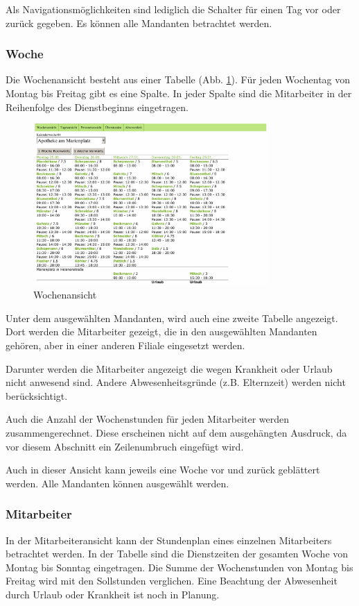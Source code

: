 \documentclass[10pt,a4paper,titlepage,oneside]{article}
\begin{document}
Als Navigationsmöglichkeiten sind lediglich die Schalter für einen Tag vor oder zurück gegeben. Es können alle Mandanten betrachtet werden.





\subsubsection{Woche}
Die Wochenansicht besteht aus einer Tabelle (Abb. \ref{fig:Wochenansicht}).
Für jeden Wochentag von Montag bis Freitag gibt es eine Spalte. In jeder Spalte sind die Mitarbeiter in der Reihenfolge des Dienstbeginns eingetragen.
\begin{figure}[h]
\centering
\includegraphics[width=0.8\textwidth]{woche-out}
\caption{Wochenansicht}
\label{fig:Wochenansicht}
\end{figure}

Unter dem ausgewählten Mandanten, wird auch eine zweite Tabelle angezeigt. Dort werden die Mitarbeiter gezeigt, die in den ausgewählten Mandanten gehören, aber in einer anderen Filiale eingesetzt werden.

Darunter werden die Mitarbeiter angezeigt die wegen Krankheit oder Urlaub nicht anwesend sind. Andere Abwesenheitsgründe (z.B. Elternzeit) werden nicht berücksichtigt.

Auch die Anzahl der Wochenstunden für jeden Mitarbeiter werden zusammengerechnet. Diese erscheinen nicht auf dem ausgehängten Ausdruck, da vor diesem Abschnitt ein Zeilenumbruch eingefügt wird. 

Auch in dieser Ansicht kann jeweils eine Woche vor und zurück geblättert werden. Alle Mandanten können ausgewählt werden.





\subsubsection{Mitarbeiter}
In der Mitarbeiteransicht kann der Stundenplan eines einzelnen Mitarbeiters betrachtet werden.
In der Tabelle sind die Dienstzeiten der gesamten Woche von Montag bis Sonntag eingetragen.
Die Summe der Wochenstunden von Montag bis Freitag wird mit den Sollstunden verglichen. Eine Beachtung der Abwesenheit durch Urlaub oder Krankheit ist noch in Planung. %
\end{document}
